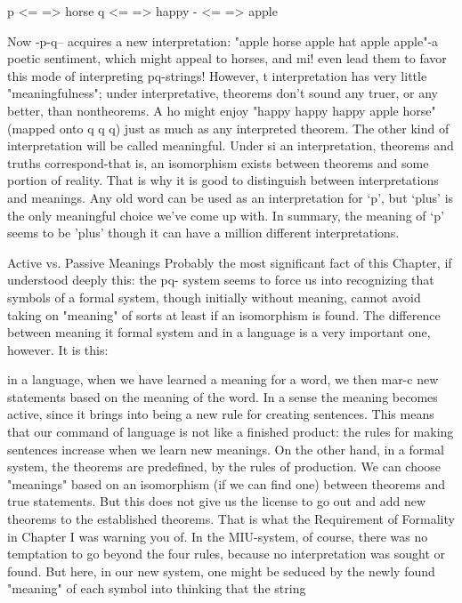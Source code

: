 p <= => horse q <= => happy - <= => apple 



Now -p-q-- acquires a new interpretation: "apple horse apple hat apple apple"-a poetic sentiment, which might appeal to horses, and mi! even lead them to favor this mode of interpreting pq-strings! However, t interpretation has very little "meaningfulness"; under interpretative, theorems don't sound any truer, or any better, than nontheorems. A ho might enjoy "happy happy happy apple horse" (mapped onto q q q) just as much as any interpreted theorem. The other kind of interpretation will be called meaningful. Under si an interpretation, theorems and truths correspond-that is, an isomorphism exists between theorems and some portion of reality. That is why it is good to distinguish between interpretations and meanings. Any old word can be used as an interpretation for `p', but `plus' is the only meaningful choice we've come up with. In summary, the meaning of `p' seems to be 'plus’ though it can have a million different interpretations. 

Active vs. Passive Meanings Probably the most significant fact of this Chapter, if understood deeply this: the pq- system seems to force us into recognizing that symbols of a formal system, though initially without meaning, cannot avoid taking on "meaning" of sorts at least if an isomorphism is found. The difference between meaning it formal system and in a language is a very important one, however. It is this: 







in a language, when we have learned a meaning for a word, we then mar-c new statements based on the meaning of the word. In a sense the meaning becomes active, since it brings into being a new rule for creating sentences. This means that our command of language is not like a finished product: the rules for making sentences increase when we learn new meanings. On the other hand, in a formal system, the theorems are predefined, by the rules of production. We can choose "meanings" based on an isomorphism (if we can find one) between theorems and true statements. But this does not give us the license to go out and add new theorems to the established theorems. That is what the Requirement of Formality in Chapter I was warning you of. In the MIU-system, of course, there was no temptation to go beyond the four rules, because no interpretation was sought or found. But here, in our new system, one might be seduced by the newly found "meaning" of each symbol into thinking that the string 

